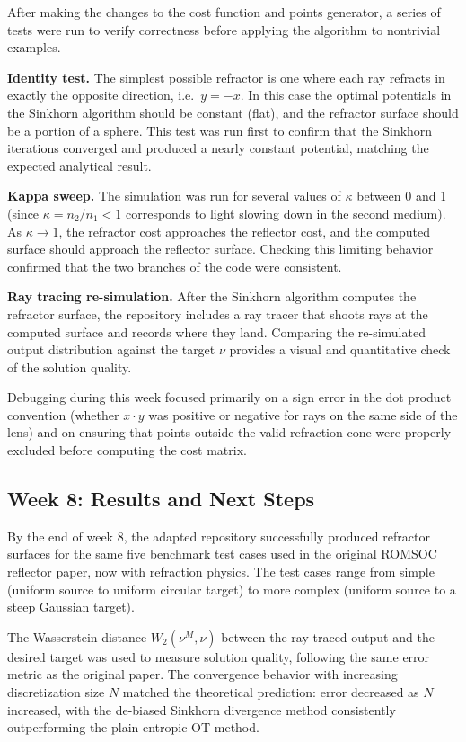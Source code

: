 \documentclass{article}
\begin{document}
After making the changes to the cost function and points generator, a series of tests
were run to verify correctness before applying the algorithm to nontrivial examples.

\textbf{Identity test.} The simplest possible refractor is one where each ray refracts
in exactly the opposite direction, i.e.\ $y = -x$. In this case the optimal potentials
in the Sinkhorn algorithm should be constant (flat), and the refractor surface should be
a portion of a sphere. This test was run first to confirm that the Sinkhorn iterations
converged and produced a nearly constant potential, matching the expected analytical
result.

\textbf{Kappa sweep.} The simulation was run for several values of $\kappa$ between 0
and 1 (since $\kappa = n_2/n_1 < 1$ corresponds to light slowing down in the second
medium). As $\kappa \to 1$, the refractor cost approaches the reflector cost, and the
computed surface should approach the reflector surface. Checking this limiting behavior
confirmed that the two branches of the code were consistent.

\textbf{Ray tracing re-simulation.} After the Sinkhorn algorithm computes the refractor
surface, the repository includes a ray tracer that shoots rays at the computed surface and
records where they land. Comparing the re-simulated output distribution against the target
$\nu$ provides a visual and quantitative check of the solution quality.

Debugging during this week focused primarily on a sign error in the dot product convention
(whether $x \cdot y$ was positive or negative for rays on the same side of the lens) and
on ensuring that points outside the valid refraction cone were properly excluded before
computing the cost matrix.

\subsection{Week 8: Results and Next Steps}

By the end of week 8, the adapted repository successfully produced refractor surfaces for
the same five benchmark test cases used in the original ROMSOC reflector paper, now with
refraction physics. The test cases range from simple (uniform source to uniform circular
target) to more complex (uniform source to a steep Gaussian target).

The Wasserstein distance $W_2(\nu^M, \nu)$ between the ray-traced output and the desired
target was used to measure solution quality, following the same error metric as the
original paper. The convergence behavior with increasing discretization size $N$ matched
the theoretical prediction: error decreased as $N$ increased, with the de-biased Sinkhorn
divergence method consistently outperforming the plain entropic OT method.
\end{document}

